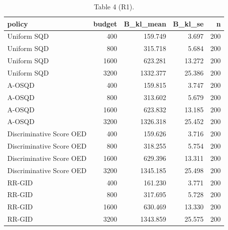 \begin{table}[t]
\centering
\small
\caption{Table 4 (R1).}
\label{tab:Table_4_R1}
\begin{tabular}{lrrrr}
\toprule
policy & budget & B\_kl\_mean & B\_kl\_se & n \\
\midrule
Uniform SQD & 400 & 159.749 & 3.697 & 200 \\
Uniform SQD & 800 & 315.718 & 5.684 & 200 \\
Uniform SQD & 1600 & 623.281 & 13.272 & 200 \\
Uniform SQD & 3200 & 1332.377 & 25.386 & 200 \\
A-OSQD & 400 & 159.815 & 3.747 & 200 \\
A-OSQD & 800 & 313.602 & 5.679 & 200 \\
A-OSQD & 1600 & 623.832 & 13.185 & 200 \\
A-OSQD & 3200 & 1326.318 & 25.452 & 200 \\
Discriminative Score OED & 400 & 159.626 & 3.716 & 200 \\
Discriminative Score OED & 800 & 318.255 & 5.754 & 200 \\
Discriminative Score OED & 1600 & 629.396 & 13.311 & 200 \\
Discriminative Score OED & 3200 & 1345.185 & 25.498 & 200 \\
RR-GID & 400 & 161.230 & 3.771 & 200 \\
RR-GID & 800 & 317.695 & 5.728 & 200 \\
RR-GID & 1600 & 630.469 & 13.330 & 200 \\
RR-GID & 3200 & 1343.859 & 25.575 & 200 \\
\bottomrule
\end{tabular}
\end{table}
